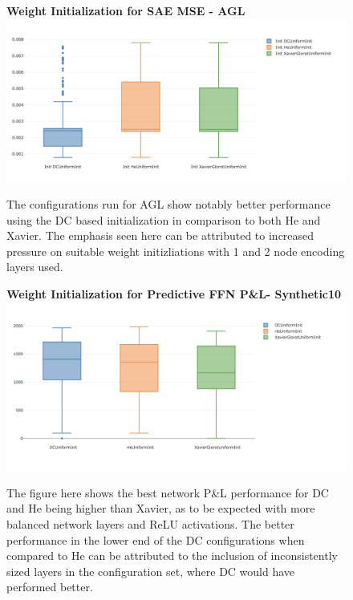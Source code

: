 \documentclass[a4paper,11pt,oneside]{article}
\theoremstyle{plain}
\theoremstyle{definition}
\begin{document}
\begin{figure}[H]
	\centering 
	\textbf{Weight Initialization for SAE MSE - AGL} 
	\includegraphics[scale=0.35]{images/iteration_five/it5_sae_init_agl.png}
	\caption{
		\newline The configurations run for AGL show notably better performance using the DC based initialization in comparison to both He and Xavier. The emphasis seen here can be attributed to increased pressure on suitable weight initizliations with 1 and 2 node encoding layers used.}
	\label{figure-results_it5_sae_init}
\end{figure}


\begin{figure}[H]
	\centering
	\textbf{Weight Initialization for Predictive FFN P\&L- Synthetic10}
	\includegraphics[scale=0.35]{images/iteration_five/init4_ffn_init.png}
	\caption{
		\newline The figure here shows the best network P\&L performance for DC and He being higher than Xavier, as to be expected with more balanced network layers and ReLU activations. The better performance in the lower end of the DC configurations when compared to He can be attributed to the inclusion of inconsistently sized layers in the configuration set, where DC would have performed better.}
	\label{figure-init4_ffn_init}
\end{figure}
\end{document}
